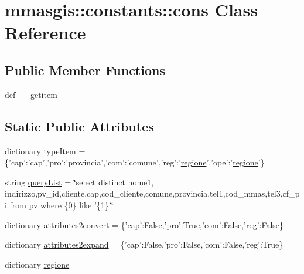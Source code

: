\hypertarget{classmmasgis_1_1constants_1_1cons}{
\section{mmasgis::constants::cons Class Reference}
\label{classmmasgis_1_1constants_1_1cons}
}
\subsection*{Public Member Functions}
\begin{DoxyCompactItemize}
\item 
def \hyperlink{classmmasgis_1_1constants_1_1cons_a6fa086aace0d93a9532b462598fd53d0}{\_\-\_\-getitem\_\-\_\-}
\end{DoxyCompactItemize}
\subsection*{Static Public Attributes}
\begin{DoxyCompactItemize}
\item 
dictionary \hyperlink{classmmasgis_1_1constants_1_1cons_aeecb71fa74ba74bd56410600855018ef}{typeItem} = \{'cap':'cap','pro':'provincia','com':'comune','reg':'\hyperlink{classmmasgis_1_1constants_1_1cons_a65ec63ca52da604dfa58670868bfbf0e}{regione}','ope':'\hyperlink{classmmasgis_1_1constants_1_1cons_a65ec63ca52da604dfa58670868bfbf0e}{regione}'\}
\item 
string \hyperlink{classmmasgis_1_1constants_1_1cons_a2872aa9e988b45cdff7256e403e0bfd0}{queryList} = \char`\"{}select distinct nome1, indirizzo,pv\_\-id,cliente,cap,cod\_\-cliente,comune,provincia,tel1,cod\_\-mmas,tel3,cf\_\-pi from pv where \{0\} like '\{1\}'\char`\"{}
\item 
dictionary \hyperlink{classmmasgis_1_1constants_1_1cons_ac2269c69153d85632883d0b6aabf7172}{attributes2convert} = \{'cap':False,'pro':True,'com':False,'reg':False\}
\item 
dictionary \hyperlink{classmmasgis_1_1constants_1_1cons_ac4dacd4136abd39f4f3ec13284fc910d}{attributes2expand} = \{'cap':False,'pro':False,'com':False,'reg':True\}
\item 
dictionary \hyperlink{classmmasgis_1_1constants_1_1cons_a65ec63ca52da604dfa58670868bfbf0e}{regione}
\end{DoxyCompactItemize}


